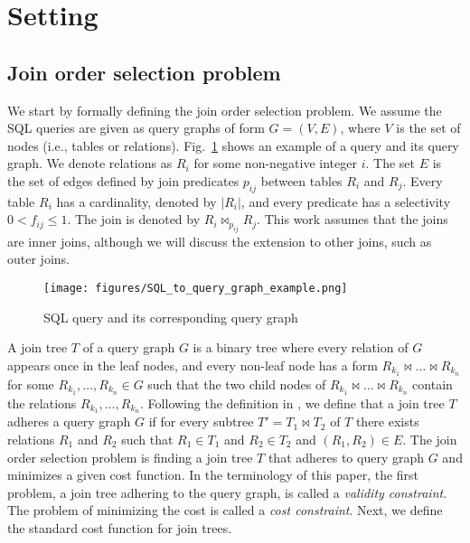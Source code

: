 \section{Setting}

\subsection{Join order selection problem}

We start by formally defining the join order selection problem. We assume the SQL queries are given as query graphs of form $G = (V, E)$, where $V$ is the set of nodes (i.e., tables or relations). Fig.~\ref{fig:SQL_query_graph} shows an example of a query and its query graph. We denote relations as $R_i$ for some non-negative integer $i$. The set $E$ is the set of edges defined by join predicates $p_{ij}$ between tables $R_i$ and $R_j$. Every table $R_i$ has a cardinality, denoted by $|R_i|$, and every predicate has a selectivity $0 < f_{ij} \leq 1$. The join is denoted by $R_i \bowtie_{p_{ij}} R_j$. This work assumes that the joins are inner joins, although we will discuss the extension to other joins, such as outer joins.

\begin{figure}[tb]
    \centering
    \texttt{[image: figures/SQL\_to\_query\_graph\_example.png]}
    \caption{SQL query and its corresponding query graph}
    \label{fig:SQL_query_graph}
\end{figure}

A join tree $T$ of a query graph $G$ is a binary tree where every relation of $G$ appears once in the leaf nodes, and every non-leaf node has a form $R_{k_1} \bowtie \ldots \bowtie R_{k_n}$ for some $R_{k_1}, \ldots, R_{k_n} \in G$ such that the two child nodes of $R_{k_1} \bowtie \ldots \bowtie R_{k_n}$ contain the relations $R_{k_1}, \ldots, R_{k_n}$. Following the definition in \cite{Neumann_Radke_2018}, we define that a join tree $T$ adheres a query graph $G$ if for every subtree $T' = T_1 \bowtie T_2$ of $T$ there exists relations $R_1$ and $R_2$ such that $R_1 \in T_1$ and $R_2 \in T_2$ and $(R_1, R_2) \in E$. The join order selection problem is finding a join tree $T$ that adheres to query graph $G$ and minimizes a given cost function. In the terminology of this paper, the first problem, a join tree adhering to the query graph, is called a \textit{validity constraint}. The problem of minimizing the cost is called a \textit{cost constraint}. Next, we define the standard cost function for join trees.

